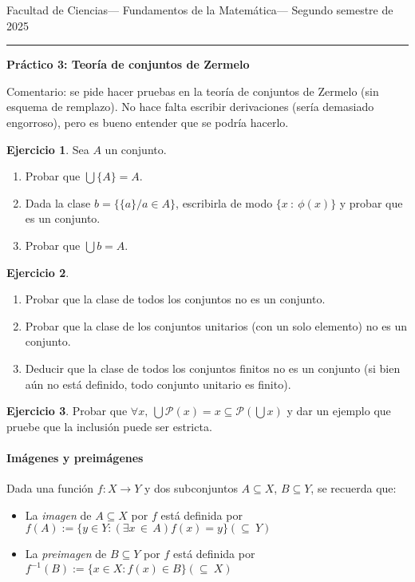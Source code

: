 \documentclass[a4paper,12pt]{book}
\def\ExIn#1#2{(\exists#1\,{\in}\,#2)}
\theoremstyle{definition}
\newtheorem{ejercicio}{Ejercicio}
\begin{document}
	
	\noindent
	\centerline{\sc
		Facultad de Ciencias\hfill---\hfill
		Fundamentos de la Matemática\hfill---\hfill
		Segundo semestre de 2025}\smallbreak\hrule
	
	\bigbreak
	\centerline{\Large\textbf{Práctico 3: Teoría de conjuntos de Zermelo}}
	\bigbreak
	
	Comentario: se pide hacer pruebas en la teoría de conjuntos de Zermelo (sin esquema de remplazo). No hace falta escribir derivaciones (sería demasiado engorroso), pero es bueno entender que se podría hacerlo.
	
	\begin{ejercicio}
		Sea $A$ un conjunto.
		\begin{enumerate}\parskip -.5ex
			\item Probar que $\bigcup\{A\} = A$.
			\item Dada la clase $b=\{\{a\}/a \in A\}$,  escribirla de modo $\{x~:~\phi(x)\}$ y probar que es un conjunto.
			\item Probar que $\bigcup b=A$.
		\end{enumerate}
	\end{ejercicio}
	
	\begin{ejercicio}
		\begin{enumerate}\parskip -.5ex
		\item Probar que la clase de todos los conjuntos no es un conjunto.
		\item Probar que la clase de los conjuntos unitarios (con un solo elemento) no es un conjunto.
		\item Deducir que la clase de todos los conjuntos finitos no es un conjunto (si bien aún no está definido, todo conjunto unitario es finito).
		\end{enumerate}
	\end{ejercicio}
	
	\begin{ejercicio}
		Probar que $\forall x,~\bigcup \mathcal{P} (x)=x\subseteq \mathcal{P} (\bigcup x)$ y dar un ejemplo que pruebe que la inclusi\'on puede ser estricta. 
	\end{ejercicio}
	
		\paragraph*{Imágenes y preimágenes}
	Dada una función $f:X\to Y$ y dos subconjuntos
	$A\subseteq X$, $B\subseteq Y$, se recuerda que:
	\begin{itemize}\parskip-.5ex
		\item La \emph{imagen} de $A\subseteq X$ por $f$ está definida por\quad
		$f(A):=\{y\in Y:\ExIn{x}{A}f(x)=y\}$\hfill$({\subseteq}~Y)$
		\item La \emph{preimagen} de $B\subseteq Y$ por $f$ está definida por\quad
		$f^{-1}(B):=\{x\in X:f(x)\in B\}$\hfill $({\subseteq}~X)$
	\end{itemize}
	
\end{document}
